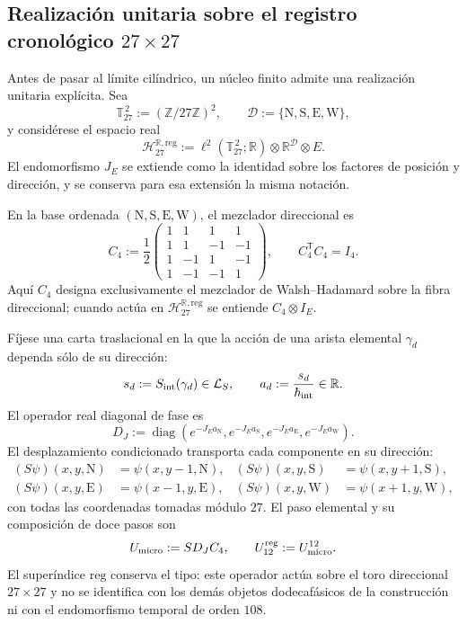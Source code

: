 \subsection{Realización unitaria sobre el registro cronológico
\texorpdfstring{\(27\times27\)}{27 x 27}}
\label{sec:realizacion-unitaria-registro-27-rev3}

Antes de pasar al límite cilíndrico, un núcleo finito admite una realización
unitaria explícita. Sea
\[
 \mathbb T_{27}^{\,2}:=(\mathbb Z/27\mathbb Z)^2,
 \qquad
 \mathcal D:=\{\mathrm N,\mathrm S,\mathrm E,\mathrm W\},
\]
y considérese el espacio real
\[
 \mathcal H_{27}^{\mathbb R,\mathrm{reg}}
 :=\ell^2(\mathbb T_{27}^{\,2};\mathbb R)
   \otimes\mathbb R^{\mathcal D}\otimes E.
\]
El endomorfismo \(J_E\) se extiende como la identidad sobre los factores de
posición y dirección, y se conserva para esa extensión la misma notación.

En la base ordenada
\((\mathrm N,\mathrm S,\mathrm E,\mathrm W)\), el mezclador direccional es
\begin{equation}
 C_4:=\frac12
 \begin{pmatrix}
  1&1&1&1\\
  1&1&-1&-1\\
  1&-1&1&-1\\
  1&-1&-1&1
 \end{pmatrix},
 \qquad C_4^{\mathsf T}C_4=I_4.
 \label{eq:mezclador-walsh-registro-27-rev3}
\end{equation}
Aquí \(C_4\) designa exclusivamente el mezclador de Walsh--Hadamard sobre la
fibra direccional; cuando actúa en
\(\mathcal H_{27}^{\mathbb R,\mathrm{reg}}\) se entiende
\(C_4\otimes I_E\).

Fíjese una carta traslacional en la que la acción de una arista elemental
\(\gamma_d\) dependa sólo de su dirección:
\[
 s_d:=S_{\rm int}(\gamma_d)\in\mathcal L_S,
 \qquad
 a_d:=\frac{s_d}{\hbar_{\rm int}}\in\mathbb R.
\]
El operador real diagonal de fase es
\[
 D_J:=\operatorname{diag}
 \left(
  e^{-J_Ea_{\mathrm N}},
  e^{-J_Ea_{\mathrm S}},
  e^{-J_Ea_{\mathrm E}},
  e^{-J_Ea_{\mathrm W}}
 \right).
\]
El desplazamiento condicionado transporta cada componente en su dirección:
\begin{align*}
 (S\psi)(x,y,\mathrm N)&=\psi(x,y-1,\mathrm N),&
 (S\psi)(x,y,\mathrm S)&=\psi(x,y+1,\mathrm S),\\
 (S\psi)(x,y,\mathrm E)&=\psi(x-1,y,\mathrm E),&
 (S\psi)(x,y,\mathrm W)&=\psi(x+1,y,\mathrm W),
\end{align*}
con todas las coordenadas tomadas módulo \(27\). El paso elemental y su
composición de doce pasos son
\begin{equation}
 U_{\rm micro}:=S D_J C_4,
 \qquad
 U_{12}^{\mathrm{reg}}:=U_{\rm micro}^{12}.
 \label{eq:paso-unitario-registro-27-rev3}
\end{equation}
El superíndice \(\mathrm{reg}\) conserva el tipo: este operador actúa sobre
el toro direccional \(27\times27\) y no se identifica con los demás objetos
dodecafásicos de la construcción ni con el endomorfismo temporal de orden \(108\).

